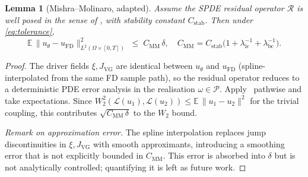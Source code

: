 \documentclass[review,12pt]{elsarticle}
\newtheorem{lemma}{Lemma}
\begin{document}
\begin{lemma}[Mishra--Molinaro, adapted]
\label{lem:mm}
Assume the SPDE residual operator \(\mathcal R\) is well posed in the
sense of \cite[Thm.~3.4]{MishraMolinaro2022}, with stability constant
\(C_{\mathrm{stab}}\). Then under \eqref{eq:tolerance},
\[
\mathbb E\,\|u_\theta - u_{\mathrm{FD}}\|^2_{L^2(\Omega \times [0,T])}
\;\le\; C_{\mathrm{MM}}\,\delta,
\quad
C_{\mathrm{MM}} = C_{\mathrm{stab}}
\bigl(1 + \lambda_{\mathrm{ic}}^{-1}
+ \lambda_{\mathrm{bc}}^{-1}\bigr).
\]
\end{lemma}
\begin{proof}
The driver fields \(\xi, J_{\mathrm{VG}}\) are identical between
\(u_\theta\) and \(u_{\mathrm{FD}}\) (spline-interpolated from the
same FD sample path), so the residual operator reduces to a
deterministic PDE error analysis in the realisation
\(\omega \in \mathcal P\). Apply~\cite[Thm.~3.4]{MishraMolinaro2022}
pathwise and take expectations. Since
\(W_2^2(\mathcal L(u_1), \mathcal L(u_2))
\le \mathbb E\,\|u_1 - u_2\|^2\) for the trivial coupling, this
contributes \(\sqrt{C_{\mathrm{MM}}\,\delta}\) to the \(W_2\) bound.

\emph{Remark on approximation error.} The spline interpolation
replaces jump discontinuities in \(\xi, J_{\mathrm{VG}}\) with
smooth approximants, introducing a smoothing error that is not
explicitly bounded in \(C_{\mathrm{MM}}\). This error is absorbed
into \(\delta\) but is not analytically controlled; quantifying
it is left as future work.
\end{proof}
\end{document}
